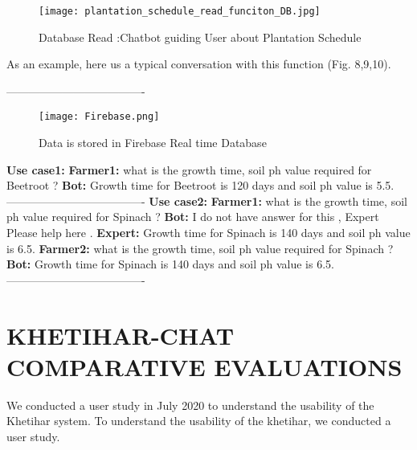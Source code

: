 \documentclass[10pt,conference]{IEEEtran}
\begin{document}
\begin{figure}
 \centering
   \texttt{[image: plantation\_schedule\_read\_funciton\_DB.jpg]}
  \caption{Database Read :Chatbot guiding User about Plantation Schedule }
\end{figure}

{\raggedright
As an example, here us a typical conversation with this function (Fig. 8,9,10).
}

{\raggedright
-------------------------------------
}
\begin{figure}
 \centering
   \texttt{[image: Firebase.png]}
  \caption{Data is stored in Firebase Real time Database }
\end{figure}

{\raggedright
\textbf{Use case1:} \newline
\textbf{Farmer1:} what is the growth time, soil ph value required for Beetroot ?  \newline
\textbf{Bot:} Growth time for Beetroot is 120 days and soil ph value is 5.5. \newline
-------------------------------------\newline
\textbf{Use case2:}\newline
\textbf{Farmer1:} what is the growth time, soil ph value required for Spinach ?\newline
\textbf{Bot:} I do not have answer for this , Expert Please help here .\newline
\textbf{Expert:} Growth time for Spinach is 140 days and soil ph value is 6.5.\newline
\textbf{Farmer2:} what is the growth time, soil ph value required for Spinach ?\newline
\textbf{Bot:} Growth time for Spinach is 140 days and soil ph value is 6.5.\newline
-------------------------------------\newline\newline
}



	\section{KHETIHAR-CHAT COMPARATIVE EVALUATIONS}

{\raggedright
We conducted a user study in July 2020 to understand the usability of the Khetihar system. To understand the usability of the khetihar, we conducted a user study.
}
\end{document}

